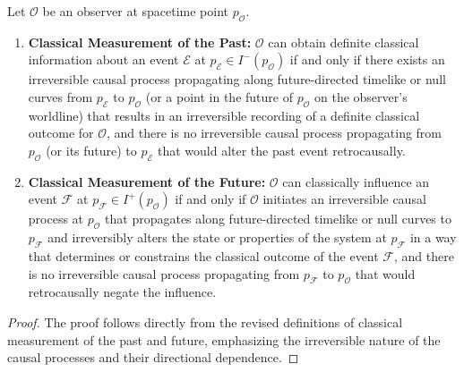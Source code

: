 	\begin{theorem}
		Let $\mathcal{O}$ be an observer at spacetime point $p_{\mathcal{O}}$.
		
		\begin{enumerate}
			\item \textbf{Classical Measurement of the Past:} $\mathcal{O}$ can obtain definite classical information about an event $\mathcal{E}$ at $p_{\mathcal{E}} \in I^-(p_{\mathcal{O}})$ if and only if there exists an irreversible causal process propagating along future-directed timelike or null curves from $p_{\mathcal{E}}$ to $p_{\mathcal{O}}$ (or a point in the future of $p_{\mathcal{O}}$ on the observer's worldline) that results in an irreversible recording of a definite classical outcome for $\mathcal{O}$, and there is no irreversible causal process propagating from $p_{\mathcal{O}}$ (or its future) to $p_{\mathcal{E}}$ that would alter the past event retrocausally.
			
			\item \textbf{Classical Measurement of the Future:} $\mathcal{O}$ can classically influence an event $\mathcal{F}$ at $p_{\mathcal{F}} \in I^+(p_{\mathcal{O}})$ if and only if $\mathcal{O}$ initiates an irreversible causal process at $p_{\mathcal{O}}$ that propagates along future-directed timelike or null curves to $p_{\mathcal{F}}$ and irreversibly alters the state or properties of the system at $p_{\mathcal{F}}$ in a way that determines or constrains the classical outcome of the event $\mathcal{F}$, and there is no irreversible causal process propagating from $p_{\mathcal{F}}$ to $p_{\mathcal{O}}$ that would retrocausally negate the influence.
		\end{enumerate}
		\begin{proof}
			The proof follows directly from the revised definitions of classical measurement of the past and future, emphasizing the irreversible nature of the causal processes and their directional dependence.
		\end{proof}
	\end{theorem}
	
